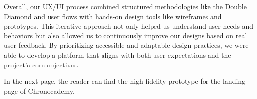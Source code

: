 Overall, our UX/UI process combined structured methodologies like the Double Diamond and user flows with hands-on design tools like wireframes and prototypes.
This iterative approach not only helped us understand user needs and behaviors but also allowed us to continuously improve our designs based on real user feedback.
By prioritizing accessible and adaptable design practices, we were able to develop a platform that aligns with both user expectations and the project’s core objectives.

In the next page, the reader can find the high-fidelity prototype for the landing page of Chronocademy.


